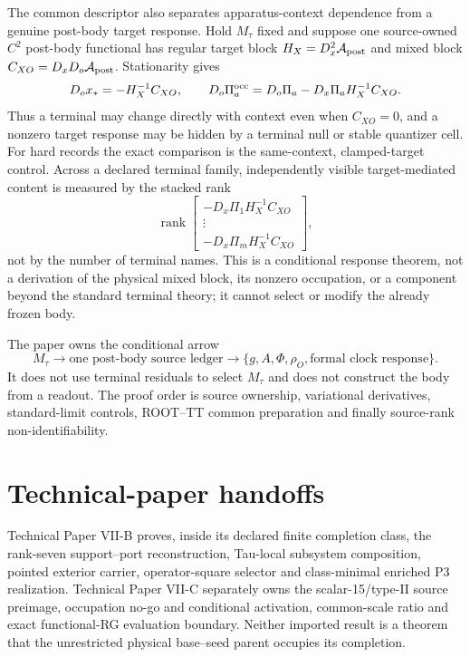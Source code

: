 \documentclass[11pt]{article}
\begin{document}
The common descriptor also separates apparatus-context dependence from a
genuine post-body target response.  Hold $M_\tau$ fixed and suppose one
source-owned $C^2$ post-body functional has regular target block
$H_X=D_x^2\mathcal A_{\rm post}$ and mixed block
$C_{XO}=D_xD_o\mathcal A_{\rm post}$.  Stationarity gives
\begin{equation}
 D_o x_*=-H_X^{-1}C_{XO},\qquad
 D_o\Pi_a^{\rm occ}
 =D_o\Pi_a-D_x\Pi_a H_X^{-1}C_{XO}.
 \label{eq:viia-generalized-backaction}
\end{equation}
Thus a terminal may change directly with context even when $C_{XO}=0$, and a
nonzero target response may be hidden by a terminal null or stable quantizer
cell.  For hard records the exact comparison is the same-context,
clamped-target control.  Across a declared terminal family, independently
visible target-mediated content is measured by the stacked rank
\begin{equation}
 \operatorname{rank}
 \begin{bmatrix}
  -D_x\Pi_1H_X^{-1}C_{XO}\\[-1mm]
  \vdots\\[-1mm]
  -D_x\Pi_mH_X^{-1}C_{XO}
 \end{bmatrix},
 \label{eq:viia-backaction-stack-rank}
\end{equation}
not by the number of terminal names.  This is a conditional response theorem,
not a derivation of the physical mixed block, its nonzero occupation, or a
component beyond the standard terminal theory; it cannot select or modify the
already frozen body.

The paper owns the conditional arrow
\[
M_\tau\longrightarrow\text{one post-body source ledger}
\longrightarrow\{g,A,\Phi,\rho_O,\text{formal clock response}\}.
\]
It does not use terminal residuals to select $M_\tau$ and does not construct
the body from a readout. The proof order is source ownership, variational
derivatives, standard-limit controls, ROOT--TT common preparation and finally
source-rank non-identifiability.

\tableofcontents
\clearpage



\section{Technical-paper handoffs}

Technical Paper VII-B proves, inside its declared finite completion class, the
rank-seven support--port reconstruction, Tau-local subsystem composition,
pointed exterior carrier, operator-square selector and class-minimal enriched
P3 realization. Technical Paper VII-C separately owns the scalar-15/type-II
source preimage, occupation no-go and conditional activation, common-scale
ratio and exact functional-RG evaluation boundary. Neither imported result is
a theorem that the unrestricted physical base--seed parent occupies its
completion.
\end{document}
